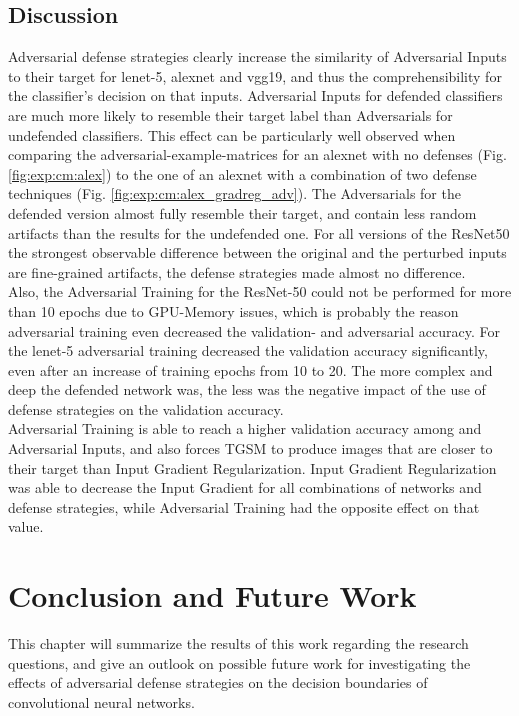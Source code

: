 \documentclass[draft,final]{vutinfth} %
\begin{document}
\clearpage

\section{Discussion}

Adversarial defense strategies clearly increase the similarity of Adversarial Inputs to their target for lenet-5, alexnet and vgg19, and thus the comprehensibility for the classifier's decision on that inputs.
Adversarial Inputs for defended classifiers are much more likely to resemble their target label than Adversarials for undefended classifiers.
This effect can be particularly well observed when comparing the adversarial-example-matrices for an alexnet with no defenses (Fig. \ref{fig:exp:cm:alex}) to the one of an alexnet with a combination of two defense techniques (Fig. \ref{fig:exp:cm:alex_gradreg_adv}).
The Adversarials for the defended version almost fully resemble their target, and contain less random artifacts than the results for the undefended one.
For all versions of the ResNet50 the strongest observable difference between the original and the perturbed inputs are fine-grained artifacts, the defense strategies made almost no difference.
\\
Also, the Adversarial Training for the ResNet-50 could not be performed for more than 10 epochs due to GPU-Memory issues, which is probably the reason adversarial training even decreased the validation- and adversarial accuracy.
For the lenet-5 adversarial training decreased the validation accuracy significantly, even after an increase of training epochs from 10 to 20.
The more complex and deep the defended network was, the less was the negative impact of the use of defense strategies on the validation accuracy.
\\
Adversarial Training is able to reach a higher validation accuracy among and Adversarial Inputs, and also forces TGSM to produce images that are closer to their target than Input Gradient Regularization.
Input Gradient Regularization was able to decrease the Input Gradient for all combinations of networks and defense strategies, while Adversarial Training had the opposite effect on that value.


\chapter{Conclusion and Future Work}

This chapter will summarize the results of this work regarding the research questions, and give an outlook on possible future work for investigating the effects of adversarial defense strategies on the decision boundaries of convolutional neural networks.\\
\end{document}
